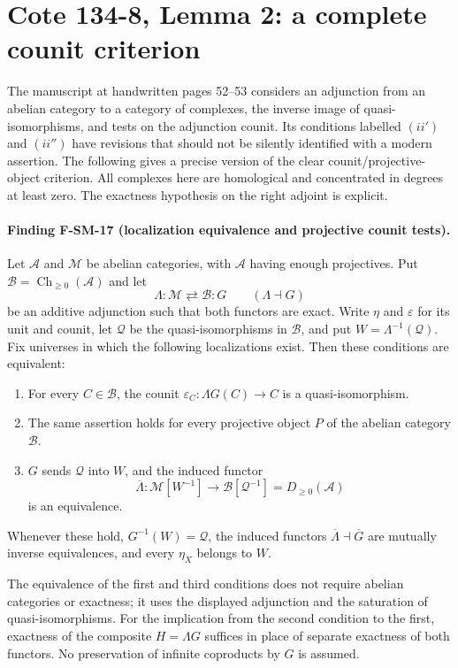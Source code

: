 \section{Cote 134-8, Lemma 2: a complete counit criterion}
\label{sec:SM-cote1348-counit}

The manuscript at handwritten pages 52--53 considers an adjunction from
an abelian category to a category of complexes, the inverse image of
quasi-isomorphisms, and tests on the adjunction counit.  Its conditions
labelled $(ii')$ and $(ii'')$ have revisions that should not be
silently identified with a modern assertion.  The following gives a
precise version of the clear counit/projective-object criterion.  All
complexes here are homological and concentrated in degrees at least
zero.  The exactness hypothesis on the right adjoint is explicit.

\paragraph{Finding F-SM-17 (localization equivalence and projective counit tests).}
Let $\mathcal A$ and $\mathcal M$ be abelian categories, with
$\mathcal A$ having enough projectives.  Put
$\mathcal B=\operatorname{Ch}_{\geq0}(\mathcal A)$ and let
\[
 \Lambda:\mathcal M\rightleftarrows\mathcal B:G
 \qquad(\Lambda\dashv G)
\]
be an additive adjunction such that both functors are exact.  Write
$\eta$ and $\varepsilon$ for its unit and counit, let
$\mathcal Q$ be the quasi-isomorphisms in $\mathcal B$, and put
$W=\Lambda^{-1}(\mathcal Q)$.  Fix universes in which the following
localizations exist.  Then these conditions are equivalent:
\begin{enumerate}
\item For every $C\in\mathcal B$, the counit
      $\varepsilon_C:\Lambda G(C)\to C$ is a quasi-isomorphism.
\item The same assertion holds for every projective object $P$ of
      the abelian category $\mathcal B$.
\item $G$ sends $\mathcal Q$ into $W$, and the induced functor
      \[
       \overline\Lambda:\mathcal M[W^{-1}]
          \longrightarrow \mathcal B[\mathcal Q^{-1}]
          =D_{\geq0}(\mathcal A)
      \]
      is an equivalence.
\end{enumerate}
Whenever these hold, $G^{-1}(W)=\mathcal Q$, the induced functors
$\overline\Lambda\dashv\overline G$ are mutually inverse equivalences,
and every $\eta_X$ belongs to $W$.

The equivalence of the first and third conditions does not require
abelian categories or exactness; it uses the displayed adjunction and
the saturation of quasi-isomorphisms.  For the implication from the
second condition to the first, exactness of the composite
$H=\Lambda G$ suffices in place of separate exactness of both functors.
No preservation of infinite coproducts by $G$ is assumed.

